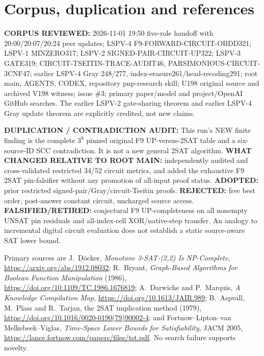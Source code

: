 \documentclass[11pt]{article}
\begin{document}
\section{Corpus, duplication and references}
\noindent\textbf{CORPUS REVIEWED:} 2026-11-01 19:50 five-role handoff with 20:00/20:07/20:24 peer updates; LSPV-4 F9-FORWARD-CIRCUIT-OBDD321; LSPV-1 MINZERO317; LSPV-2 SIGNED-PAIR-CIRCUIT-UP322; LSPV-3 GATE319; CIRCUIT-TSEITIN-TRACE-AUDIT46, PARSIMONIOUS-CIRCUIT-3CNF47; earlier LSPV-4 Gray 248/277, index-erasure261/head-recoding291; root main, AGENTS, CODEX, repository pnp-research skill; U198 original source and archived V198 witness; issue \#3; primary paper/model and project/OpenAI GitHub searches. The earlier LSPV-2 gate-sharing theorem and earlier LSPV-4 Gray update theorem are explicitly credited, not new claims.

\noindent\textbf{DUPLICATION / CONTRADICTION AUDIT:} This run's NEW finite finding is the complete $3^9$ pinned original F9 UP-versus-2SAT table and a six-source-ID SCC contradiction. It is not a new general 2SAT algorithm. \textbf{WHAT CHANGED RELATIVE TO ROOT MAIN:} independently audited and cross-validated restricted 34/52 circuit metrics, and added the exhaustive F9 2SAT pin-falsifier without any promotion of all-input proof status. \textbf{ADOPTED:} prior restricted signed-pair/Gray/circuit-Tseitin proofs. \textbf{REJECTED:} free best order, post-answer constant circuit, uncharged source access. \textbf{FALSIFIED/RETIRED:} conjectural F9 UP-completeness on all nonempty UNSAT pin residuals and all-index-cell XOR/native-step transfer. An analogy to incremental digital circuit evaluation does not establish a static source-aware SAT lower bound.

Primary sources are J.~D\"ocker, \emph{Monotone 3-SAT-(2,2) Is NP-Complete}, \url{https://arxiv.org/abs/1912.08032}; R.~Bryant, \emph{Graph-Based Algorithms for Boolean Function Manipulation} (1986), \url{https://doi.org/10.1109/TC.1986.1676819}; A.~Darwiche and P.~Marquis, \emph{A Knowledge Compilation Map}, \url{https://doi.org/10.1613/JAIR.989}; B.~Aspvall, M.~Plass and R.~Tarjan, the 2SAT implication method (1979), \url{https://doi.org/10.1016/0020-0190(79)90002-4}; and Fortnow--Lipton--van Melkebeek--Viglas, \emph{Time-Space Lower Bounds for Satisfiability}, JACM 2005, \url{https://lance.fortnow.com/papers/files/tst.pdf}. No search failure supports novelty.
\end{document}
